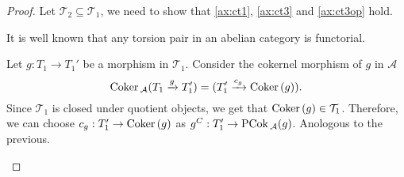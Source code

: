\begin{proof}
  Let $\mathcal{T}_2\subseteq\mathcal{T}_1$, we need to show that \cref{ax:ct1},
  \cref{ax:ct3} and \cref{ax:ct3op} hold.
  \begin{torsionaxioms}
    \item It is well known that any torsion pair in an abelian category is functorial.
    \setcounter{enumi}{2}
    \item Let $g:T_1\to T_1'$ be a morphism in $\mathcal{T}_1$. Consider the cokernel morphism
    of $g$ in $\mathcal{A}$
    \begin{equation*}
      \mathrm{\textup{Coker\,}}_\mathcal{A}(T_1\xrightarrow{g}T_1')=(T_1'\xrightarrow{c_g}\mathrm{\textup{Coker\,}}(g)).
    \end{equation*}
    Since $\mathcal{T}_1$ is closed under quotient objects, we get that $\mathrm{\textup{Coker\,}}(g)\in\mathcal{T}_1$.
    Therefore, we can choose $c_g:T_1'\to\mathrm{\textup{Coker\,}}(g)$ as $g^C:T_1'\to\mathrm{\textup{PCok\,}}_\mathcal{A}(g)$.
    \varitem{^\ast} Anologous to the previous.
  \end{torsionaxioms}
\end{proof}

%
%
